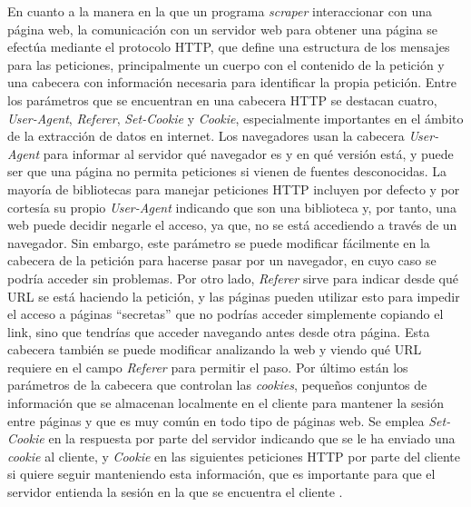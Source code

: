 En cuanto a la manera en la que un programa \textit{scraper} interaccionar con
una página web, la comunicación con un servidor web para obtener una página se
efectúa mediante el protocolo HTTP, que define una estructura de los mensajes
para las peticiones, principalmente un cuerpo con el contenido de la petición y
una cabecera con información necesaria para identificar la propia petición.
Entre los parámetros que se encuentran en una cabecera HTTP se destacan cuatro,
\textit{User-Agent}, \textit{Referer}, \textit{Set-Cookie} y \textit{Cookie},
especialmente importantes en el ámbito de la extracción de datos en internet.
Los navegadores usan la cabecera \textit{User-Agent} para informar al servidor
qué navegador es y en qué versión está, y puede ser que una página no permita
peticiones si vienen de fuentes desconocidas. La mayoría de bibliotecas para
manejar peticiones HTTP incluyen por defecto y por cortesía su propio
\textit{User-Agent} indicando que son una biblioteca y, por tanto, una web puede
decidir negarle el acceso, ya que, no se está accediendo a través de un
navegador. Sin embargo, este parámetro se puede modificar fácilmente en la
cabecera de la petición para hacerse pasar por un navegador, en cuyo caso se
podría acceder sin problemas. Por otro lado, \textit{Referer} sirve para indicar
desde qué URL se está haciendo la petición, y las páginas pueden utilizar esto
para impedir el acceso a páginas ``secretas'' que no podrías acceder simplemente
copiando el link, sino que tendrías que acceder navegando antes desde otra
página. Esta cabecera también se puede modificar analizando la web y viendo qué
URL requiere en el campo \textit{Referer} para permitir el paso. Por último
están los parámetros de la cabecera que controlan las \textit{cookies}, pequeños
conjuntos de información que se almacenan localmente en el cliente para mantener
la sesión entre páginas y que es muy común en todo tipo de páginas web. Se
emplea \textit{Set-Cookie} en la respuesta por parte del servidor indicando que
se le ha enviado una \textit{cookie} al cliente, y \textit{Cookie} en las
siguientes peticiones HTTP por parte del cliente si quiere seguir manteniendo
esta información, que es importante para que el servidor entienda la sesión en
la que se encuentra el cliente \cite{apress2018scraping}.

